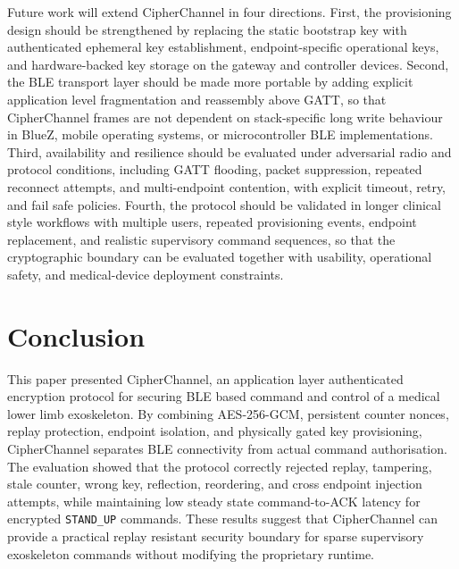 \documentclass[journal]{IEEEtran}
\begin{document}
Future work will extend CipherChannel in four directions. First, the provisioning design should be strengthened by replacing the static bootstrap key with authenticated ephemeral key establishment, endpoint-specific operational keys, and hardware-backed key storage on the gateway and controller devices. Second, the BLE transport layer should be made more portable by adding explicit application level fragmentation and reassembly above GATT, so that CipherChannel frames are not dependent on stack-specific long write behaviour in BlueZ, mobile operating systems, or microcontroller BLE implementations. Third, availability and resilience should be evaluated under adversarial radio and protocol conditions, including GATT flooding, packet suppression, repeated reconnect attempts, and multi-endpoint contention, with explicit timeout, retry, and fail safe policies. Fourth, the protocol should be validated in longer clinical style workflows with multiple users, repeated provisioning events, endpoint replacement, and realistic supervisory command sequences, so that the cryptographic boundary can be evaluated together with usability, operational safety, and medical-device deployment constraints.



\section{Conclusion}
\label{sec:conclusion}

This paper presented CipherChannel, an application layer authenticated encryption protocol for securing BLE based command and control of a medical lower limb exoskeleton. By combining AES-256-GCM, persistent counter nonces, replay protection, endpoint isolation, and physically gated key provisioning, CipherChannel separates BLE connectivity from actual command authorisation. The evaluation showed that the protocol correctly rejected replay, tampering, stale counter, wrong key, reflection, reordering, and cross endpoint injection attempts, while maintaining low steady state command-to-ACK latency for encrypted \texttt{STAND\_UP} commands. These results suggest that CipherChannel can provide a practical replay resistant security boundary for sparse supervisory exoskeleton commands without modifying the proprietary runtime.

\end{document}
